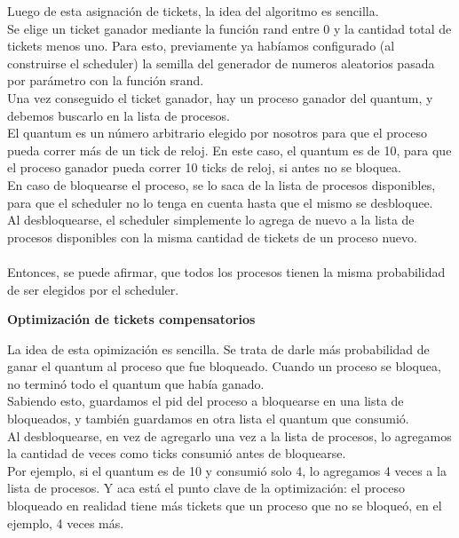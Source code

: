 \indent Luego de esta asignación de tickets, la idea del algoritmo es sencilla. \\
Se elige un ticket ganador mediante la función rand entre 0 y la cantidad total de tickets menos uno. Para esto, previamente ya habíamos configurado (al construirse el scheduler) la semilla del
generador de numeros aleatorios pasada por parámetro con la función srand.\\
Una vez conseguido el ticket ganador, hay un proceso ganador del quantum, y debemos buscarlo en la lista de procesos. \\
El quantum es un número arbitrario elegido por nosotros para que el proceso pueda correr más de un tick de reloj. 
En este caso, el quantum es de 10, para que el proceso ganador pueda correr 10 ticks de reloj, si antes no se bloquea. \\
En caso de bloquearse el proceso, se lo saca de la lista de procesos disponibles, 
para que el scheduler no lo tenga en cuenta hasta que el mismo se desbloquee. \\
Al desbloquearse, el scheduler simplemente lo agrega de nuevo a la lista de procesos disponibles con la misma cantidad de
tickets de un proceso nuevo.\\\\

Entonces, se puede afirmar, que todos los procesos tienen la misma probabilidad de ser elegidos por el scheduler.\\

\begin{center}
 \textbf{Optimización de tickets compensatorios}
\end{center}

La idea de esta opimización es sencilla. Se trata de darle más probabilidad de ganar el quantum al proceso que fue bloqueado.
Cuando un proceso se bloquea, no terminó todo el quantum que había ganado.\\
Sabiendo esto, guardamos el pid del proceso a bloquearse en una lista de bloqueados, y también guardamos en otra lista 
el quantum que consumió.\\
Al desbloquearse, en vez de agregarlo una vez a la lista de procesos, lo agregamos la cantidad de veces como ticks 
consumió antes de bloquearse. \\
Por ejemplo, si el quantum es de 10 y consumió solo 4, lo agregamos 4 veces a la lista de procesos. 
Y aca está el punto clave de la optimización: el proceso bloqueado en realidad tiene más tickets que un proceso 
que no se bloqueó, en el ejemplo, 4 veces más.\\